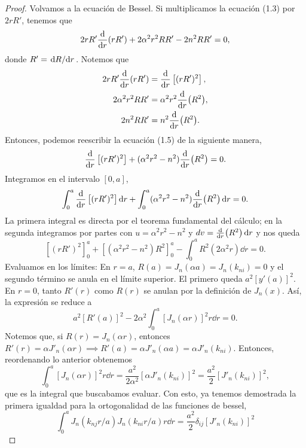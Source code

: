 \documentclass[11pt]{article}
\theoremstyle{definition}
\numberwithin{equation}{section}
\begin{document}
\begin{proof}
	Volvamos a la ecuación de Bessel. Si multiplicamos la ecuación (1.3) por $2rR'$, tenemos que
	\begin{equation}
		2r R' \dv{r}(r R') + 2\alpha^2 r^2 R R' - 2n^2 R R' = 0,
	\end{equation}
	donde $R' = \dv*{R}{r}$. Notemos que
	\begin{align}
		2r R' \dv{r}(r R') & = \dv{r} \left[ (rR')^2 \right], \\
		2\alpha^2 r^2 R R' & = \alpha^2 r^2 \dv{r} (R^2),     \\
		2n^2 R R'          & = n^2 \dv{r} (R^2).
	\end{align}
	Entonces, podemos reescribir la ecuación (1.5) de la siguiente manera,
	\begin{equation}
		\dv{r} \left[ (rR')^2 \right] + (\alpha^2 r^2 - n^2) \dv{r} (R^2) = 0.
	\end{equation}
	Integramos en el intervalo $[0,a]$,
	\begin{equation}
		\int_0^a \dv{r} \left[ (rR')^2 \right] \dd{r} + \int_0^a (\alpha^2 r^2 - n^2) \dv{r} (R^2) \dd{r} = 0.
	\end{equation}
	La primera integral es directa por el teorema fundamental del cálculo; en la segunda integramos por partes con $u = \alpha^2 r^2 - n^2$ y $dv = \dv{r}(R^2) \dd{r}$ y nos queda
	\begin{equation}
		\left[ (rR')^2 \right]_0^a + \left[ (\alpha^2 r^2 - n^2) R^2 \right]_0^a - \int_0^a R^2 (2\alpha^2 r) \dd{r} = 0.
	\end{equation}
	Evaluamos en los límites: En $r = a$, $R(a) = J_n(\alpha a) = J_n(k_{ni}) = 0$ y el segundo término se anula en el límite superior. El primero queda $a^2 [y'(a)]^2$. En $r = 0$, tanto $R'(r)$ como $R(r)$ se anulan por la definición de $J_n(x)$. Así, la expresión se reduce a
	\begin{equation}
		a^2 [R'(a)]^2 - 2\alpha^2 \int_0^a [J_n(\alpha r)]^2 r\dd{r} = 0.
	\end{equation}
	Notemos que, si $R(r) = J_n(\alpha r)$, entonces $R'(r) = \alpha J'_n(\alpha r) \implies R'(a) = \alpha J'_n(\alpha a) = \alpha J'_n(k_{ni})$. Entonces, reordenando lo anterior obtenemos
	\begin{equation}
		\int_0^a [J_n(\alpha r)]^2 r\dd{r} = \frac{a^2}{2\alpha^2} \left[ \alpha J'_n(k_{ni}) \right]^2 = \frac{a^2}{2} [J'_n(k_{ni})]^2,
	\end{equation}
	que es la integral que buscabamos evaluar. Con esto, ya tenemos demostrada la primera igualdad para la ortogonalidad de las funciones de bessel,
	\begin{equation}
		\boxed{\int_0^a J_n(k_{nj}r/a)J_n(k_{ni}r/a)r\dd{r}= \frac{a^2}{2}\delta_{ij} [J'_n(k_{ni})]^2}
	\end{equation}


\end{proof}
\end{document}
